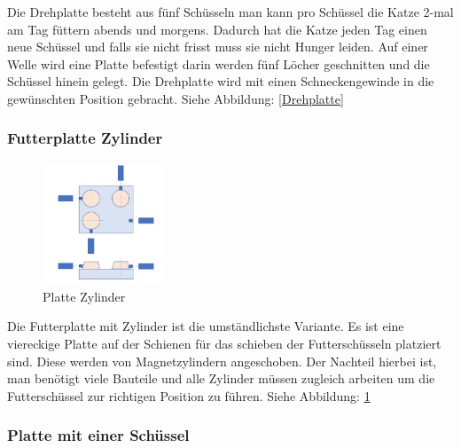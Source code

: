 Die Drehplatte besteht aus fünf Schüsseln man kann pro Schüssel die Katze 2-mal am Tag füttern abends und morgens. Dadurch hat die Katze jeden Tag einen neue Schüssel und falls sie nicht frisst muss sie nicht Hunger leiden. Auf einer Welle wird eine Platte befestigt 
darin werden fünf Löcher geschnitten und die Schüssel hinein gelegt. Die Drehplatte wird mit einen Schneckengewinde in die gewünschten Position gebracht. Siehe Abbildung:  	
 \ref{Drehplatte} \vspace{+80pt}
 

\subsubsection{Futterplatte Zylinder}

\begin{figure}
\vspace{-50pt}
  \begin{center}
    \includegraphics[width=0.32\textwidth]{Bilder/Powerpoint/Platte_Zylinder}
  \end{center}
  \caption{Platte Zylinder}
  \label{Platte Zylinder}
  \vspace{-20pt}
\end{figure}

Die Futterplatte mit Zylinder ist die umständlichste Variante. Es ist eine viereckige Platte auf der Schienen für das schieben der Futterschüsseln platziert sind. Diese werden von Magnetzylindern angeschoben. Der Nachteil hierbei ist, man benötigt viele Bauteile und alle Zylinder müssen zugleich arbeiten um die Futterschüssel zur richtigen Position zu führen. Siehe Abbildung: \ref{Platte Zylinder}



\newpage
\subsubsection{Platte mit einer Schüssel}

